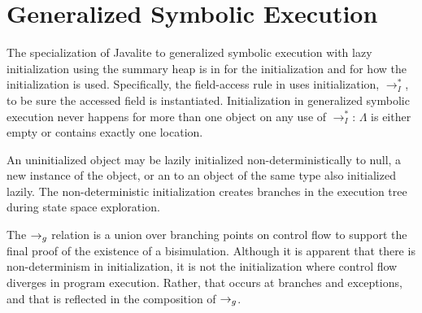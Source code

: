 \section{Generalized Symbolic Execution}

The specialization of Javalite to generalized symbolic execution with
lazy initialization using the summary heap is in 
for the initialization and  for how the
initialization is used. Specifically, the field-access rule in
 uses initialization, $\rightarrow_I^*$, to be sure
the accessed field is instantiated. Initialization in generalized
symbolic execution never happens for more than one object on any use
of $\rightarrow_I^*$: $\Lambda$ is either empty or contains exactly one
location.

An uninitialized object may be lazily initialized
non-deterministically to null, a new instance of the object, or an to
an object of the same type also initialized lazily. The
non-deterministic initialization creates branches in the execution
tree during state space exploration. 

The $\rightarrow_{g}$ relation is a union over branching points on control flow
to support the final proof of the existence of a
bisimulation. Although it is apparent that there is non-determinism in
initialization, it is not the initialization where control flow
diverges in program execution. Rather, that occurs at branches and
exceptions, and that is reflected in the composition of $\rightarrow_{g}$.



